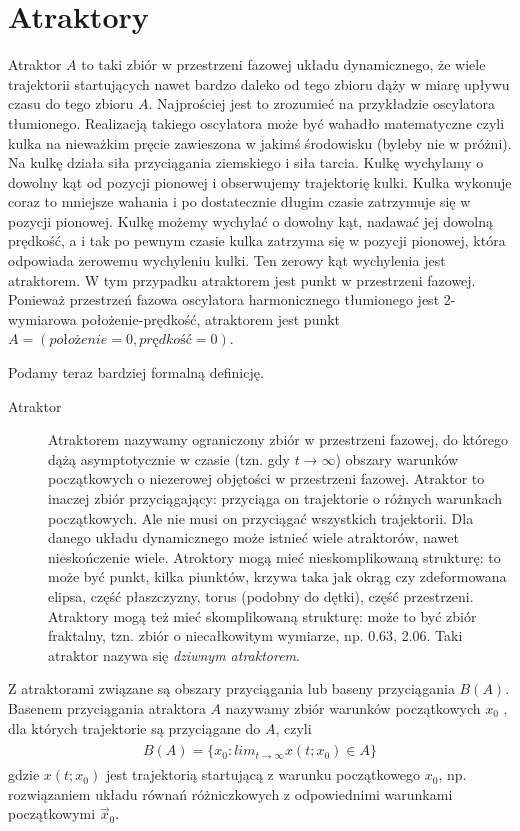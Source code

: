 \documentclass[a4paper,12pt,polish]{sphinxmanual}
\begin{document}
\section{Atraktory}
\label{ch1/chI024:atraktory}\label{ch1/chI024::doc}
Atraktor $A$ to taki zbiór w przestrzeni fazowej układu dynamicznego, że wiele trajektorii startujących nawet bardzo daleko od tego zbioru  dąży w miarę upływu czasu do tego zbioru $A$.  Najprościej jest to zrozumieć na przykładzie oscylatora tłumionego. Realizacją takiego oscylatora może być wahadło matematyczne czyli kulka  na nieważkim pręcie zawieszona w jakimś środowisku (byleby nie w próżni). Na kulkę działa siła przyciągania ziemskiego i siła tarcia. Kulkę wychylamy o dowolny kąt od pozycji pionowej  i obserwujemy trajektorię  kulki. Kulka wykonuje coraz to mniejsze wahania i po dostatecznie długim czasie zatrzymuje się w pozycji pionowej. Kulkę możemy wychylać o dowolny kąt, nadawać jej dowolną prędkość, a i tak po pewnym czasie kulka zatrzyma  się w pozycji pionowej, która odpowiada zerowemu wychyleniu kulki. Ten zerowy kąt wychylenia jest atraktorem. W tym przypadku atraktorem jest  punkt w przestrzeni fazowej. Ponieważ przestrzeń fazowa oscylatora harmonicznego  tłumionego jest 2-wymiarowa położenie-prędkość, atraktorem jest punkt $A = (położenie = 0, prędkość = 0)$.

Podamy teraz bardziej formalną definicję.
\begin{description}
\item[{Atraktor}] \leavevmode
Atraktorem nazywamy ograniczony zbiór w przestrzeni fazowej, do którego dążą asymptotycznie w czasie (tzn. gdy $t \to \infty$) obszary warunków początkowych o niezerowej objętości  w przestrzeni fazowej. Atraktor to inaczej zbiór przyciągający: przyciąga on trajektorie o różnych warunkach początkowych.  Ale nie musi on przyciągać wszystkich trajektorii. Dla danego układu dynamicznego może istnieć wiele atraktorów, nawet nieskończenie wiele. Atroktory mogą mieć  nieskomplikowaną strukturę: to może być  punkt, kilka piunktów, krzywa taka jak okrąg czy zdeformowana elipsa, część płaszczyzny, torus (podobny do dętki),  część przestrzeni. Atraktory mogą też  mieć skomplikowaną strukturę: może to być zbiór fraktalny, tzn. zbiór o niecałkowitym wymiarze, np. 0.63, 2.06. Taki atraktor nazywa się \emph{dziwnym atraktorem}.

\end{description}

Z atraktorami związane są obszary przyciągania lub baseny przyciągania $B(A)$. Basenem przyciągania atraktora $A$ nazywamy zbiór warunków początkowych $x_0$ , dla których trajektorie są przyciągane do $A$, czyli
\label{ch1/chI024:equation-eqn1}\begin{gather}
\begin{split}B(A) = \{ x_0: lim_{t \to \infty} x(t; x_0) \in A\}\end{split}\label{ch1/chI024-eqn1}
\end{gather}
gdzie $x(t; x_0)$ jest trajektorią startującą z warunku początkowego $x_0$, np. rozwiązaniem układu równań różniczkowych  z odpowiednimi warunkami początkowymi $\vec x_0$.
\end{document}
